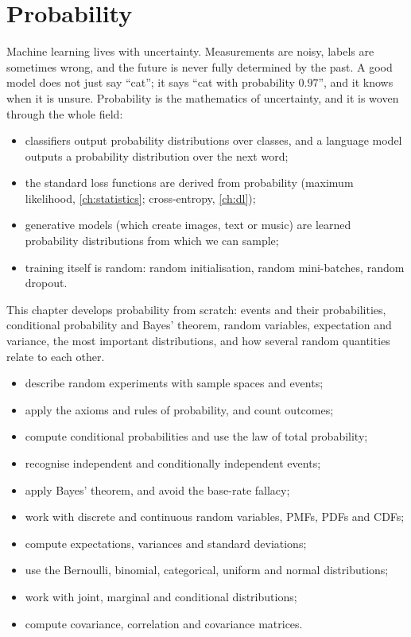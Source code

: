 \chapter{Probability}\label{ch:probability}

\begin{motivation}
Machine learning lives with uncertainty. Measurements are noisy, labels are
sometimes wrong, and the future is never fully determined by the past. A good
model does not just say ``cat''; it says ``cat with probability $0.97$'', and it
knows when it is unsure. Probability is the mathematics of uncertainty, and it
is woven through the whole field:
\begin{itemize}
  \item classifiers output probability distributions over classes, and a
    language model outputs a probability distribution over the next word;
  \item the standard loss functions are derived from probability (maximum
    likelihood, \cref{ch:statistics}; cross-entropy, \cref{ch:dl});
  \item generative models (which create images, text or music) are learned
    probability distributions from which we can sample;
  \item training itself is random: random initialisation, random mini-batches,
    random dropout.
\end{itemize}
This chapter develops probability from scratch: events and their probabilities,
conditional probability and Bayes' theorem, random variables, expectation and
variance, the most important distributions, and how several random quantities
relate to each other.
\end{motivation}

\begin{objectives}
\begin{itemize}
  \item describe random experiments with sample spaces and events;
  \item apply the axioms and rules of probability, and count outcomes;
  \item compute conditional probabilities and use the law of total probability;
  \item recognise independent and conditionally independent events;
  \item apply Bayes' theorem, and avoid the base-rate fallacy;
  \item work with discrete and continuous random variables, PMFs, PDFs and CDFs;
  \item compute expectations, variances and standard deviations;
  \item use the Bernoulli, binomial, categorical, uniform and normal
    distributions;
  \item work with joint, marginal and conditional distributions;
  \item compute covariance, correlation and covariance matrices.
\end{itemize}
\end{objectives}

